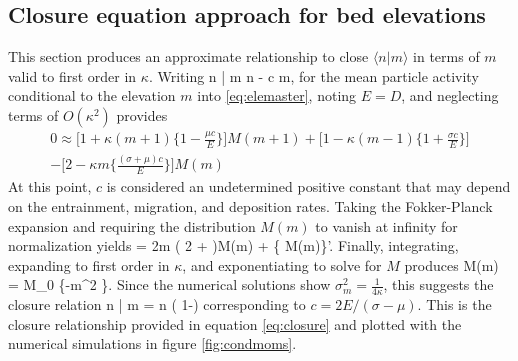 \subsection{Closure equation approach for bed elevations}
This section produces an approximate relationship to close
$\langle n | m \rangle$ in terms of $m$ valid to first order in $\kappa$. Writing 
\be \langle n | m \rangle \approx \langle n \rangle  - \kappa c m,\ee
for the mean particle activity conditional to the elevation $m$ into \ref{eq:elemaster}, noting $E=D$, and neglecting terms of $O(\kappa^2)$ provides 
\begin{multline} 0 \approx \Big[ 1+\kappa(m+1)\Big\{ 1-\frac{\mu c}{E}\Big\}\Big]M(m+1) + \Big[1-\kappa(m-1)\Big\{1+\frac{\sigma c}{E}\Big\}\Big]\\-\Big[2-\kappa m\Big\{\frac{(\sigma+\mu)c}{E}\Big\}\Big]M(m)
\end{multline}
At this point, $c$ is considered an undetermined positive constant that may depend on the entrainment, migration, and deposition rates.
Taking the Fokker-Planck expansion and requiring the distribution $M(m)$ to vanish at infinity for normalization yields
 = 2\kappa m \Big( 2 + \Big)M(m) + \Big\{
M(m)\Big\}'.\ee
Finally, integrating, expanding to first order in $\kappa$, and exponentiating to solve for $M$ produces
\be M(m) = M_0 \exp\Big\{-\kappa m^2 \Big\}.\ee
Since the numerical solutions show $\sigma_m^2 = \frac{1}{4\kappa}$, this suggests the closure relation
\be \langle n | m \rangle = \langle n \rangle\Big( 1-\Big) \ee
corresponding to $c=2E/(\sigma-\mu)$. This is the closure relationship provided in equation \ref{eq:closure} and plotted with the numerical simulations in figure \ref{fig:condmoms}.